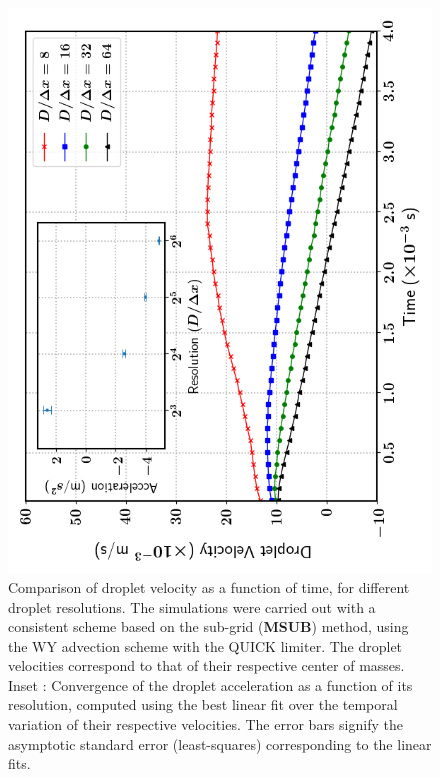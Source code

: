 \begin{figure}
\begin{center}
\includegraphics[width = 1.0\textwidth]{plots/raindrop/jcp_2.png}
\end{center}
\vspace*{-0.5cm}
\caption{Comparison of droplet velocity as a function of time, for different droplet resolutions.
	The simulations were carried out with a consistent scheme based on the 
	sub-grid (\textbf{MSUB}) method, using the WY advection scheme with the QUICK limiter. 
	The droplet velocities correspond to that of their respective center of masses. 
	Inset : Convergence of the droplet acceleration as a function of its resolution, 
	computed using the best linear fit over the temporal variation of their respective velocities. 
	The error bars signify the asymptotic standard error (least-squares) corresponding to the linear fits.} 
\label{drop_vel_jcp}
\end{figure}


